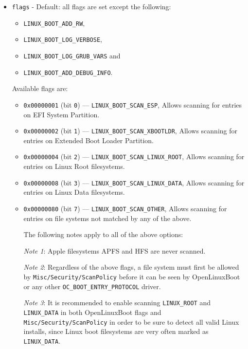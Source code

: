 \documentclass[]{article}
\providecommand{\tightlist}{%
  \setlength{\itemsep}{0pt}\setlength{\parskip}{0pt}}
\begin{document}
\begin{itemize}
\tightlist
  \item \texttt{flags} - Default: all flags are set except the following:
  \begin{itemize}
  \tightlist
    \item \texttt{LINUX\_BOOT\_ADD\_RW},
    \item \texttt{LINUX\_BOOT\_LOG\_VERBOSE},
    \item \texttt{LINUX\_BOOT\_LOG\_GRUB\_VARS} and
    \item \texttt{LINUX\_BOOT\_ADD\_DEBUG\_INFO}.
  \end{itemize}
  \medskip

  Available flags are: \medskip

  \begin{itemize}
  \tightlist
    \item \texttt{0x00000001} (bit \texttt{0}) --- \texttt{LINUX\_BOOT\_SCAN\_ESP},
    Allows scanning for entries on EFI System Partition.
    \item \texttt{0x00000002} (bit \texttt{1}) --- \texttt{LINUX\_BOOT\_SCAN\_XBOOTLDR},
    Allows scanning for entries on Extended Boot Loader Partition.
    \item \texttt{0x00000004} (bit \texttt{2}) --- \texttt{LINUX\_BOOT\_SCAN\_LINUX\_ROOT},
    Allows scanning for entries on Linux Root filesystems.
    \item \texttt{0x00000008} (bit \texttt{3}) --- \texttt{LINUX\_BOOT\_SCAN\_LINUX\_DATA},
    Allows scanning for entries on Linux Data filesystems.
    \item \texttt{0x00000080} (bit \texttt{7}) --- \texttt{LINUX\_BOOT\_SCAN\_OTHER},
    Allows scanning for entries on file systems not matched by any of the above. \medskip

    The following notes apply to all of the above options: \medskip

    \emph{Note 1}: Apple filesystems APFS and HFS are never scanned.
    \medskip

    \emph{Note 2}: Regardless of the above flags, a file system must first be
    allowed by \texttt{Misc/Security/ScanPolicy} before it can be seen by
    OpenLinuxBoot or any other \texttt{OC\_BOOT\_ENTRY\_PROTOCOL} driver.
    \medskip

    \emph{Note 3}: It is recommended to enable scanning \texttt{LINUX\_ROOT} and \texttt{LINUX\_DATA}
    in both OpenLinuxBoot flags and \texttt{Misc/Security/ScanPolicy} in order to be sure to detect
    all valid Linux installs, since Linux boot filesystems are very often marked as \texttt{LINUX\_DATA}.
    \medskip


\end{itemize}
\end{itemize}
\end{document}
